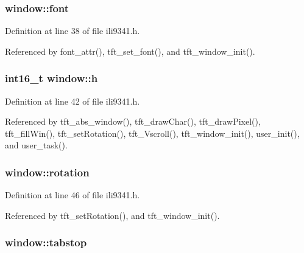 \hypertarget{structwindow_acee24e56db43557a46cbb5ca3fe35021}{
\subsubsection[{font}]{ window\-::font}}\label{structwindow_acee24e56db43557a46cbb5ca3fe35021}


Definition at line 38 of file ili9341.\-h.



Referenced by font\-\_\-attr(), tft\-\_\-set\-\_\-font(), and tft\-\_\-window\-\_\-init().

\hypertarget{structwindow_a822391abd5d09e6ce7152f68cff3ef2b}{
\subsubsection[{h}]{\setlength{\rightskip}{0pt plus 5cm}int16\-\_\-t window\-::h}}\label{structwindow_a822391abd5d09e6ce7152f68cff3ef2b}


Definition at line 42 of file ili9341.\-h.



Referenced by tft\-\_\-abs\-\_\-window(), tft\-\_\-draw\-Char(), tft\-\_\-draw\-Pixel(), tft\-\_\-fill\-Win(), tft\-\_\-set\-Rotation(), tft\-\_\-\-Vscroll(), tft\-\_\-window\-\_\-init(), user\-\_\-init(), and user\-\_\-task().

\hypertarget{structwindow_afbd48ebcb41e68d0f458dac593578aa8}{
\subsubsection[{rotation}]{ window\-::rotation}}\label{structwindow_afbd48ebcb41e68d0f458dac593578aa8}


Definition at line 46 of file ili9341.\-h.



Referenced by tft\-\_\-set\-Rotation(), and tft\-\_\-window\-\_\-init().

\hypertarget{structwindow_a88d2836d45dd428d8fadfd703f0f965f}{
\subsubsection[{tabstop}]{ window\-::tabstop}}\label{structwindow_a88d2836d45dd428d8fadfd703f0f965f}


